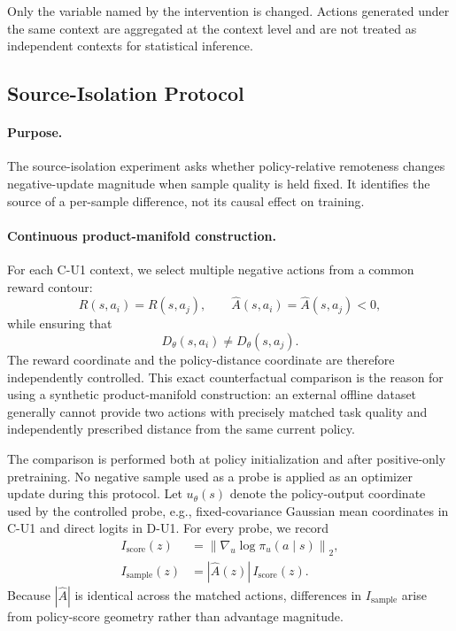 Only the variable named by the intervention is changed. Actions generated
under the same context are aggregated at the context level and are not
treated as independent contexts for statistical inference.


\subsection{Source-Isolation Protocol}
\label{app:source_isolation_protocol}

\paragraph{Purpose.}
The source-isolation experiment asks whether policy-relative remoteness
changes negative-update magnitude when sample quality is held fixed. It
identifies the source of a per-sample difference, not its causal effect on
training.

\paragraph{Continuous product-manifold construction.}
For each C-U1 context, we select multiple negative actions from a common
reward contour:
\begin{equation}
    R(s,a_i)
    =
    R(s,a_j),
    \qquad
    \widehat A(s,a_i)
    =
    \widehat A(s,a_j)
    <0,
    \label{eq:source_equal_quality}
\end{equation}
while ensuring that
\begin{equation}
    D_\theta(s,a_i)
    \neq
    D_\theta(s,a_j).
    \label{eq:source_different_remoteness}
\end{equation}
The reward coordinate and the policy-distance coordinate are therefore
independently controlled. This exact counterfactual comparison is the
reason for using a synthetic product-manifold construction: an external
offline dataset generally cannot provide two actions with precisely
matched task quality and independently prescribed distance from the
same current policy.

The comparison is performed both at policy initialization and after
positive-only pretraining. No negative sample used as a probe is applied
as an optimizer update during this protocol. Let \(u_\theta(s)\) denote
the policy-output coordinate used by the controlled probe, e.g.,
fixed-covariance Gaussian mean coordinates in C-U1 and direct logits in
D-U1. For every probe, we record
\begin{equation}
\begin{aligned}
I_{\mathrm{score}}(z)
&=
\left\|
\nabla_{u}\log \pi_{u}(a\mid s)
\right\|_2,\\
I_{\mathrm{sample}}(z)
&=
|\widehat A(z)|\, I_{\mathrm{score}}(z).
\end{aligned}
\label{eq:source_influence_metrics}
\end{equation}
Because \(|\widehat A|\) is identical across the matched actions,
differences in \(I_{\mathrm{sample}}\) arise from policy-score geometry
rather than advantage magnitude.

